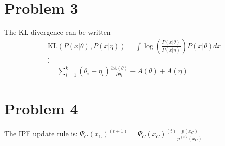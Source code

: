 \documentclass[12pt]{article}
\begin{document}
\section*{Problem 3}
\label{sec:prob3}
The KL divergence can be written 
\begin{equation}
    \begin{split}
        &\text{KL}(P(x|\theta),P(x|\eta)) = \int \log\left(\frac{P(x|\theta)}{P(x|\eta)}\right)P(x|\theta) dx\\
        & . \\
        & . \\
        & = \sum_{i=1}^k (\theta_i - \eta_i) \frac{\partial A(\theta)}{\partial \theta_i} - A(\theta) + A(\eta)
    \end{split}
\end{equation}


\section*{Problem 4}
\label{sec:prob4}

The IPF update rule is: $\Psi_C(x_C)^{(t+1)} = \Psi_C(x_C)^{(t)} \frac{\tilde{p}(x_C)}{p^{(t)}(x_C)}$
\end{document}
